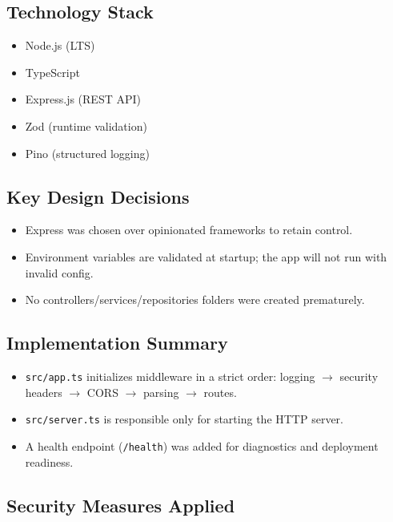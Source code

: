 \documentclass[11pt,a4paper]{article}
\begin{document}
    \subsection{Technology Stack}

    \begin{itemize}
        \item Node.js (LTS)
        \item TypeScript
        \item Express.js (REST API)
        \item Zod (runtime validation)
        \item Pino (structured logging)
    \end{itemize}

    \subsection{Key Design Decisions}

    \begin{itemize}
        \item Express was chosen over opinionated frameworks to retain control.
        \item Environment variables are validated at startup; the app will not run with invalid config.
        \item No controllers/services/repositories folders were created prematurely.
    \end{itemize}

    \subsection{Implementation Summary}

    \begin{itemize}
        \item \texttt{src/app.ts} initializes middleware in a strict order:
        logging $\rightarrow$ security headers $\rightarrow$ CORS $\rightarrow$ parsing $\rightarrow$ routes.
        \item \texttt{src/server.ts} is responsible only for starting the HTTP server.
        \item A health endpoint (\texttt{/health}) was added for diagnostics and deployment readiness.
    \end{itemize}

    \subsection{Security Measures Applied}
\end{document}
